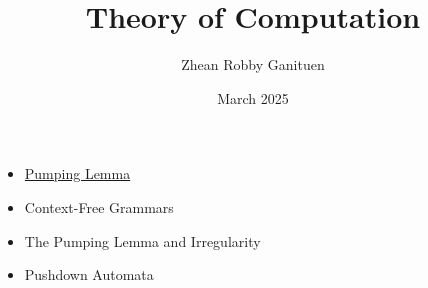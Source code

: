 \documentclass{article}
\title{Theory of Computation}
\author{Zhean Robby Ganituen}
\date{March 2025}
\begin{document}
\maketitle

\begin{itemize}
    \item \hyperref[pumping_lemma_chapter]{Pumping Lemma}
    \item Context-Free Grammars
    \item The Pumping Lemma and Irregularity
    \item Pushdown Automata
\end{itemize}

\end{document}
